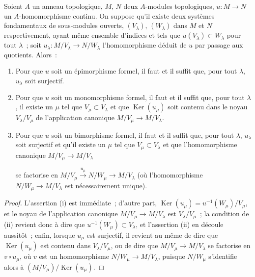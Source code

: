 \begin{proposition}[19.1.3]
\label{0.19.1.3-fr}
Soient $A$ un anneau topologique, $M$, $N$ deux $A$-modules topologiques,
$u:M\to N$ un $A$-homomorphisme continu. On suppose qu'il existe deux systèmes
fondamentaux de sous-modules ouverts, $(V_\lambda)$, $(W_\lambda)$ dans $M$ et
$N$ respectivement, ayant même ensemble d'indices et tels que
$u(V_\lambda)\subset W_\lambda$ pour tout $\lambda$~; soit
$u_\lambda:M/V_\lambda\to N/W_\lambda$ l'homomorphisme déduit de $u$ par
passage aux quotients. Alors~:
\begin{enumerate}
  \item[(i)] Pour que $u$ soit un épimorphisme formel, il faut et il suffit que,
  pour tout $\lambda$, $u_\lambda$ soit surjectif.
  \item[(ii)] Pour que $u$ soit un monomorphisme formel, il faut et il suffit
  que, pour tout $\lambda$, il existe un $\mu$ tel que
  $V_\mu\subset V_\lambda$ et que $\operatorname{Ker}(u_\mu)$ soit contenu
  dans le noyau $V_\lambda/V_\mu$ de l'application canonique
  $M/V_\mu\to M/V_\lambda$.
  \item[(iii)] Pour que $u$ soit un bimorphisme formel, il faut et il suffit
  que, pour tout $\lambda$, $u_\lambda$ soit surjectif et qu'il existe un
  $\mu$ tel que $V_\mu\subset V_\lambda$ et que l'homomorphisme canonique
  $M/V_\mu\to M/V_\lambda$


  \noindent se factorise en
  $M/V_\mu\xrightarrow{u_\mu}N/W_\mu\to M/V_\lambda$ (où
  l'homomorphisme $N/W_\mu\to M/V_\lambda$ est nécessairement unique).
\end{enumerate}
\end{proposition}

\begin{proof}
L'assertion (i) est immédiate~; d'autre part,
$\operatorname{Ker}(u_\mu)=u^{-1}(W_\mu)/V_\mu$, et le noyau de l'application
canonique $M/V_\mu\to M/V_\lambda$ est $V_\lambda/V_\mu$~; la condition de
(ii) revient donc à dire que $u^{-1}(W_\mu)\subset V_\lambda$, et l'assertion
(ii) en découle aussitôt~; enfin, lorsque $u_\mu$ est surjectif, il revient au
même de dire que $\operatorname{Ker}(u_\mu)$ est contenu dans
$V_\lambda/V_\mu$, ou de dire que $M/V_\mu\to M/V_\lambda$ se factorise en
$v\circ u_\mu$, où $v$ est un homomorphisme
$N/W_\mu\to M/V_\lambda$, puisque $N/W_\mu$ s'identifie alors à
$(M/V_\mu)/\operatorname{Ker}(u_\mu)$.
\end{proof}

